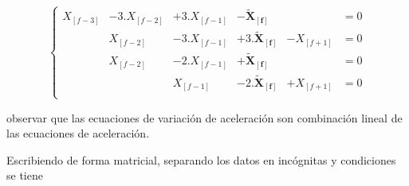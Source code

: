 \begin{equation}
\left\{
\begin{matrix}
X_{[f-3]} &-3.X_{[f-2]} &+3.X_{[f-1]} &-\boldsymbol{\tilde{X}_{[f]}} & &=0 \\
 &X_{[f-2]} &-3.X_{[f-1]} &+3.\boldsymbol{\boldsymbol{\tilde{X}_{[f]}}} &-X_{[f+1]} &=0 \\
 &X_{[f-2]} &-2.X_{[f-1]} &+\boldsymbol{\boldsymbol{\tilde{X}_{[f]}}} & &=0 \\
 & &X_{[f-1]} &-2.\boldsymbol{\boldsymbol{\tilde{X}_{[f]}}} &+X_{[f+1]} &=0 \\
\end{matrix}
\right.
\label{ecuaciones_estimacion_01}
\end{equation}

observar que las ecuaciones de variación de aceleración son combinación lineal de las ecuaciones de aceleración.

Escribiendo de forma matricial, separando los datos en incógnitas y condiciones se tiene

